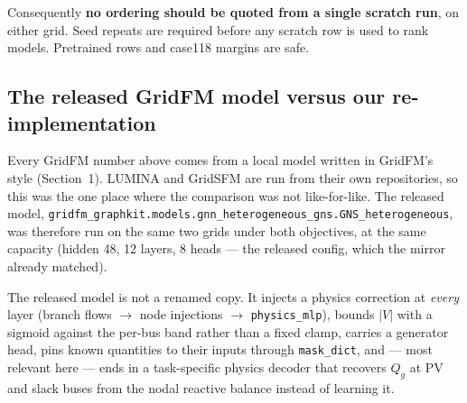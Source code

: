 \documentclass[10pt]{article}
\begin{document}
Consequently \textbf{no ordering should be quoted from a single scratch run},
on either grid. Seed repeats are required before any scratch row is used to rank
models. Pretrained rows and case118 margins are safe.

\subsection*{The released GridFM model versus our re-implementation}
\label{sec:graphkit}

Every GridFM number above comes from a local model written in GridFM's style
(Section~1). LUMINA and GridSFM are run from their own repositories, so this was
the one place where the comparison was not like-for-like. The released model,
\texttt{gridfm\_graphkit.models.gnn\_heterogeneous\_gns.GNS\_heterogeneous}, was
therefore run on the same two grids under both objectives, at the same capacity
(hidden 48, 12 layers, 8 heads --- the released config, which the mirror already
matched).

The released model is not a renamed copy. It injects a physics correction at
\emph{every} layer (branch flows \(\rightarrow\) node injections \(\rightarrow\)
\texttt{physics\_mlp}), bounds \(|V|\) with a sigmoid against the per-bus band
rather than a fixed clamp, carries a generator head, pins known quantities to
their inputs through \texttt{mask\_dict}, and --- most relevant here --- ends in
a task-specific physics decoder that recovers \(Q_g\) at PV and slack buses from
the nodal reactive balance instead of learning it.
\end{document}

